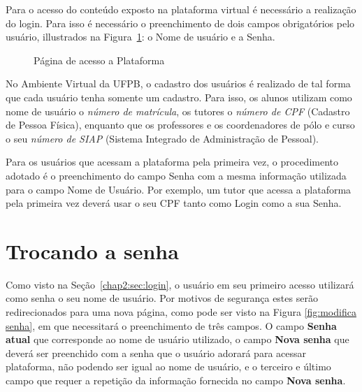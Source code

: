 Para o acesso do conteúdo exposto na plataforma virtual é necessário a realização do login.
Para isso é necessário o preenchimento de dois campos obrigatórios pelo usuário, illustrados 
na Figura~\ref{fig:login}: o Nome de usuário e a Senha.

\begin{figure}[htbp]
 \begin{center}
  \caption{Página de acesso a Plataforma}
  \label{fig:login}
 \end{center}
\end{figure}

No Ambiente Virtual da UFPB, o cadastro dos usuários é realizado de tal forma que cada usuário tenha somente 
um cadastro. Para isso, os alunos utilizam como nome de usuário o \emph{número de matrícula}, os tutores o \emph{número de CPF} (Cadastro de Pessoa Física), enquanto que os professores e os coordenadores de pólo e curso o seu \emph{número de SIAP} (Sistema Integrado de Administração de Pessoal).

Para os usuários que acessam a plataforma pela primeira vez, o procedimento adotado é o preenchimento do campo Senha com a mesma informação utilizada para o campo Nome de Usuário. Por exemplo, um tutor que acessa a plataforma pela primeira vez deverá 
usar o seu CPF tanto como Login como a sua Senha.
\section{Trocando a senha}
\label{chap2:sec:trocando}
Como visto na Seção~\ref{chap2:sec:login}, o usuário em seu primeiro acesso utilizará como senha o seu nome de usuário. Por motivos de segurança estes serão redirecionados para uma nova página, como pode ser visto na Figura \ref{fig:modifica senha}, em que necessitará o preenchimento de três campos. O campo \textbf{Senha atual} que corresponde ao nome de usuário utilizado, o campo \textbf{Nova senha} que deverá ser preenchido com a senha que o usuário adorará para acessar plataforma, não podendo ser igual ao nome de usuário, e o terceiro e último campo que requer a repetição da informação fornecida no campo \textbf{Nova senha}.

